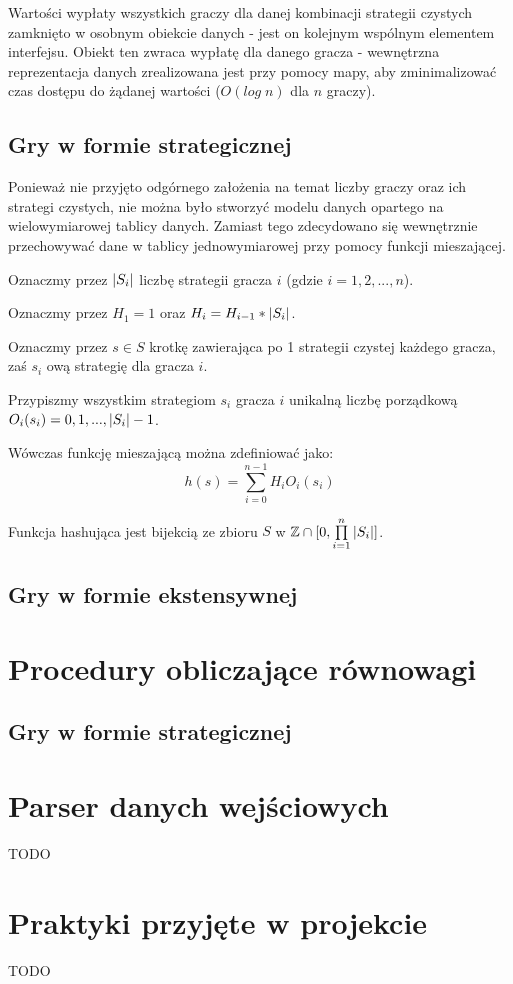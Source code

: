 \documentclass{standalone}
\begin{document}
Wartości wypłaty wszystkich graczy dla danej kombinacji strategii czystych zamknięto w osobnym obiekcie
danych - jest on kolejnym wspólnym elementem interfejsu. Obiekt ten zwraca wypłatę dla danego gracza -
wewnętrzna reprezentacja danych zrealizowana jest przy pomocy mapy, aby zminimalizować czas dostępu do
żądanej wartości ($O(log\;n)$ dla $n$ graczy).

\subsection{Gry w formie strategicznej}

Ponieważ nie przyjęto odgórnego założenia na temat liczby graczy oraz ich strategi czystych, nie można było
stworzyć modelu danych opartego na wielowymiarowej tablicy danych. Zamiast tego zdecydowano się wewnętrznie
przechowywać dane w tablicy jednowymiarowej przy pomocy funkcji mieszającej.

Oznaczmy przez $|S_i|$ liczbę strategii gracza $i$ (gdzie $i = 1, 2, ..., n$).

Oznaczmy przez $H_1 = 1$ oraz $H_i = H_{i-1} * |S_i|$.

Oznaczmy przez $s \in S$ krotkę zawierająca po 1 strategii czystej każdego gracza, zaś $s_i$ ową strategię
dla gracza $i$.

Przypiszmy wszystkim strategiom $s_i$ gracza $i$ unikalną liczbę porządkową $O_i(s_i) = 0, 1, ..., |S_i|-1$.

Wówczas funkcję mieszającą można zdefiniować jako:
$$h(s) = \sum\limits_{i=0}^{n-1} H_i O_i(s_i)$$

\begin{theorem}
Funkcja hashująca jest bijekcią ze zbioru $S$ w $ \mathbb{Z} \cap [0, \prod\limits_{i=1}^{n} |S_i|] $.
\end{theorem}



\subsection{Gry w formie ekstensywnej}

\section{Procedury obliczające równowagi}

\subsection{Gry w formie strategicznej}

\section{Parser danych wejściowych}

TODO

\section{Praktyki przyjęte w projekcie}

TODO
\end{document}
